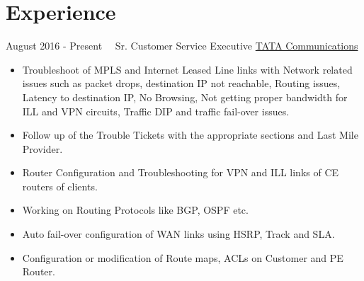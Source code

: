 \documentclass[letterpaper]{twentysecondcv} %
\begin{document}
\makeprofile %
 

\section{Experience}

\begin{twenty} %
\twentyitem
   		{August 2016 -}
		{Present}
        {~~Sr. Customer Service Executive}
        {\href{https://www.tatacommunications.com/}{TATA Communications}}
        {}
        {
        {\begin{itemize}
        \item  Troubleshoot of MPLS and Internet Leased Line links with Network related issues such as packet drops, destination IP not reachable, Routing issues, Latency to destination IP, No Browsing, Not getting proper bandwidth for ILL and VPN circuits, Traffic DIP and traffic fail-over issues.
        \item  Follow up of the Trouble Tickets with the appropriate sections and Last Mile Provider.
        \item  Router Configuration and Troubleshooting for VPN and ILL links of CE routers of clients.
        \item  Working on Routing Protocols like BGP, OSPF etc.
        \item  Auto fail-over configuration of WAN links using HSRP, Track and SLA.
        \item  Configuration or modification of Route maps, ACLs on Customer and PE Router.
    \end{itemize}}
        }

\end{twenty}

\end{document}
